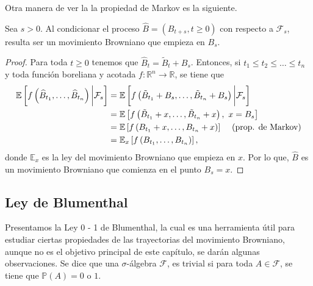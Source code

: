 Otra manera de ver la la propiedad de Markov es la siguiente.

\begin{proposition}
Sea $s > 0$. Al condicionar el proceso $\widehat{B} = (B_{t+s}, t \geq 0)$ con respecto a $\mathcal{F}_s$, resulta ser un movimiento Browniano que empieza en $B_s$.
\begin{proof}
Para toda $t \geq 0$ tenemos que $\widehat{B}_t = \tilde{B}_t + B_s$. Entonces, si $t_1 \leq t_2 \leq \ldots \leq t_n$ y toda función boreliana y acotada $ f : \mathbb{R}^n \rightarrow \mathbb{R}$, se tiene que
	\begin{align*}
	\mathbb{E} \left[ f \left( \widehat{B}_{t_1}, \ldots, \widehat{B}_{t_n} \right) \bigg| \mathcal{F}_s \right] & = \mathbb{E} \left[ f \left( \tilde{B}_{t_1} + B_s, \ldots, \tilde{B}_{t_n} + B_s \right) \bigg| \mathcal{F}_s \right] \\
	& = \mathbb{E} \left[ f \left( \tilde{B}_{t_1} + x, \ldots, \tilde{B}_{t_n} + x \right), \ x = B_s \right] \\
	& = \mathbb{E} \left[ f \left( B_{t_1} + x, \ldots, B_{t_n} + x \right) \right] \hspace{0.3cm} \text{ (prop. de Markov)} \\
	& = \mathbb{E}_{x} \left[ f \left( B_{t_1}, \ldots, B_{t_n} \right) \right],
	\end{align*}
donde $\mathbb{E}_x$ es la ley del movimiento Browniano que empieza en $x$. Por lo que, $\widehat{B}$ es un movimiento Browniano que comienza en el punto $B_s = x$.
\end{proof}
\end{proposition}

\subsection{Ley de Blumenthal}
Presentamos la Ley 0 - 1 de Blumenthal, la cual es una herramienta útil para estudiar ciertas propiedades de las trayectorias del movimiento Browniano, aunque no es el objetivo principal de este capítulo, se darán algunas observaciones. Se dice que una $\sigma$-álgebra  $\mathcal{F}$, es trivial si para toda $A \in \mathcal{F}$, se tiene que $\mathbb{P}(A) = 0$ o $1$.

